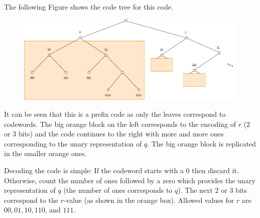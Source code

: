 \vspace*{3mm}

The following Figure shows the code tree for this code.

\begin{figure}[H]
  \centering
  \includegraphics[scale=0.4]{images/2021-05-18-golomb_1.png}
\end{figure}

It can be seen that this is a prefix code as only the leaves correspond to codewords. The big orange block on the left corresponds to the encoding of $r$ ($2$ or $3$ bits) and the code continues to the right with more and more ones corresponding to the unary representation of $q$. The big orange block is replicated in the smaller orange ones.

Decoding the code is simple: If the codeword starts with a $0$ then discard it. Otherwise, count the number of ones followed by a zero which provides the unary representation of $q$ (the number of ones corresponds to $q$). The next $2$ or $3$ bits correspond to the $r$-value (as shown in the orange box). Allowed values for $r$ are $00, 01, 10, 110$, and $111$. 



